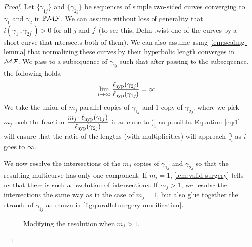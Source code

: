 \documentclass[12pt, reqno]{amsart}
\begin{document}
\begin{proof}
  Let $\{\gamma_{1j}\}$ and $\{ \gamma_{2j}\}$ be sequences of simple two-sided curves converging to $\gamma_1$ and $\gamma_2$ in $\mathbb{P}\mathcal{MF}$.
  We can assume without loss of generality that $i(\gamma_{1i}, \gamma_{2j^{\prime}}) > 0$ for all $j$ and $j^{\prime}$ (to see this, Dehn twist one of the curves by a short curve that intersects both of them).
  We can also assume using \autoref{lem:scaling-lemma} that normalizing these curves by their hyperbolic length converges in $\mathcal{MF}$.
  We pass to a subsequence of $\gamma_{2j}$ such that after passing to the subsequence,
  the following holds.
  \begin{align}
    \label{eq:1}
    \lim_{i \to \infty} \frac{\ell_{\mathrm{hyp}}(\gamma_{2j})}{\ell_{\mathrm{hyp}}(\gamma_{1j})} = \infty
  \end{align}
  We take the union of $m_j$ parallel copies of $\gamma_{1j}$ and $1$ copy of $\gamma_{2j}$, where we pick $m_j$ such the fraction $\displaystyle \frac{m_j \cdot \ell_{\mathrm{hyp}}(\gamma_{1j})}{\ell_{\mathrm{hyp}}(\gamma_{2j})}$ is as close to $\displaystyle \frac{c_1}{c_2}$ as possible.
  Equation \eqref{eq:1} will ensure that the ratio of the lengths (with multiplicities) will approach $\displaystyle \frac{c_1}{c_2}$ as $i$ goes to $\infty$.

  We now resolve the intersections of the $m_j$ copies of $\gamma_{1j}$ and $\gamma_{2j}$ so that the resulting multicurve has only one component.
  If $m_j = 1$, \autoref{lem:valid-surgery} tells us that there is such a resolution of intersections.
  If $m_j > 1$, we resolve the intersections the same way as in the case of $m_j = 1$, but also glue together the strands of $\gamma_{1j}$ as shown in \autoref{fig:parallel-surgery-modification}.
  \begin{figure}[h]
    \centering
    \caption{Modifying the resolution when $m_j > 1$.}
    \label{fig:parallel-surgery-modification}
  \end{figure}


\end{proof}
\end{document}

